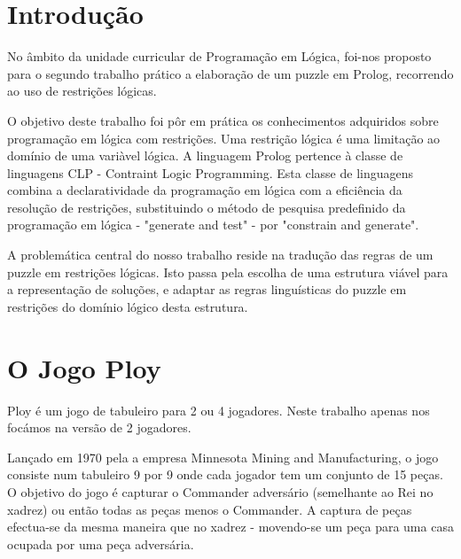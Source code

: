 \documentclass[a4paper]{article}
\begin{document}

\newpage

\tableofcontents



\newpage

\section{Introdução}
No âmbito da unidade curricular de Programação em Lógica, foi-nos proposto para o segundo trabalho prático a elaboração de um puzzle em Prolog, recorrendo ao uso de restrições lógicas.

O objetivo deste trabalho foi pôr em prática os conhecimentos adquiridos sobre programação em lógica com restrições. Uma restrição lógica é uma limitação ao domínio de uma variàvel lógica. A linguagem Prolog pertence à classe de linguagens CLP - Contraint Logic Programming. Esta classe de linguagens combina a declaratividade da programação em lógica com a eficiência da resolução de restrições, substituindo o método de pesquisa predefinido da programação em lógica - "generate and test" - por "constrain and generate".

A problemática central do nosso trabalho reside na tradução das regras de um puzzle em restrições lógicas. Isto passa pela escolha de uma estrutura viável para a representação de soluções, e adaptar as regras linguísticas do puzzle em restrições do domínio lógico desta estrutura.

\section{O Jogo Ploy}
Ploy é um jogo de tabuleiro para 2 ou 4 jogadores. Neste trabalho apenas nos focámos na versão de 2 jogadores.

Lançado em 1970 pela a empresa Minnesota Mining and Manufacturing, o jogo consiste num tabuleiro 9 por 9 onde cada jogador tem um conjunto de 15 peças.
O objetivo do jogo é capturar o Commander adversário (semelhante ao Rei no xadrez) ou então todas as peças menos o Commander. A captura de peças efectua-se da mesma maneira que no xadrez - movendo-se um peça para uma casa ocupada por uma peça adversária.
\end{document}
